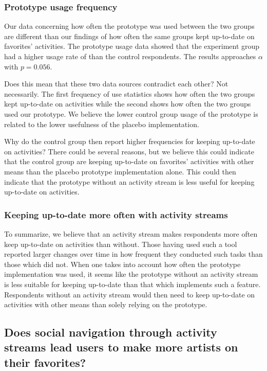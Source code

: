 \subsubsection{Prototype usage frequency}

Our data concerning how often the prototype was used between the two groups%
are different than our findings of how often the same groups kept up-to-date
on favorites' activities. The prototype usage data showed that the experiment
group had a higher usage rate of \latest{} than the control respondents. The
results approaches $\alpha$ with $p = 0.056$.

Does this mean that these two data sources contradict each other? Not
necessarily. The first frequency of use statistics shows how often the two
groups kept up-to-date on activities while the second shows how often
the two groups used our prototype. We believe the lower control group usage of
the prototype is related to the lower usefulness of the placebo
implementation.

Why do the control group then report higher frequencies for keeping up-to-date
on activities? There could be several reasons, but we believe this could
indicate that the control group are keeping up-to-date on favorites'
activities with other means than the placebo prototype implementation alone.
This could then indicate that the prototype without an activity stream is less
useful for keeping up-to-date on activities.

\subsubsection{Keeping up-to-date more often with activity streams}

To summarize, we believe that an activity stream makes respondents
more often keep up-to-date on activities than without. Those having used such
a tool reported larger changes over time in how frequent they conducted such
tasks than those which did not. When one takes into account how often the
prototype implementation was used, it seems like the prototype without
an activity stream is less suitable for keeping up-to-date than that which
implements such a feature. Respondents without an activity stream would
then need to keep up-to-date on activities with other means than solely
relying on the prototype.

\subsection{%
  Does social navigation through activity streams lead users to make
  more artists on \urort{} their favorites?
}


